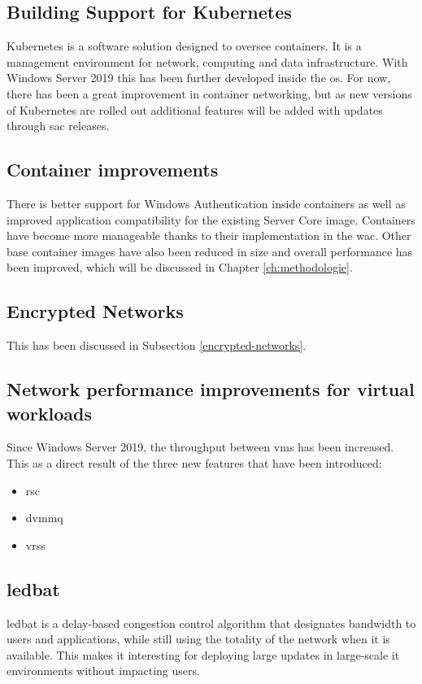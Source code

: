 \subsection*{Building Support for Kubernetes}
Kubernetes is a software solution designed to oversee containers. 
It is a management environment for network, computing and data infrastructure. 
With Windows Server 2019 this has been further developed inside the \acrshort{os}. 
For now, there has been a great improvement in container networking, but as new versions of Kubernetes are rolled out additional features will be added with updates through \acrfull{sac} releases.
\subsection*{Container improvements}
There is better support for Windows Authentication inside containers as well as improved application compatibility for the existing Server Core image. 
Containers have become more manageable thanks to their implementation in the \acrlong{wac}.
Other base container images have also been reduced in size and overall performance has been improved, which will be discussed in Chapter \ref{ch:methodologie}. 
\subsection*{Encrypted Networks}
This has been discussed in Subsection \ref{encrypted-networks}.
\subsection*{Network performance improvements for virtual workloads}
Since Windows Server 2019, the throughput between \acrshort{vm}s has been increased. 
This as a direct result of the three new features that have been introduced:
\begin{itemize}
	\item \acrfull{rsc}
	\item \acrfull{dvmmq}
	\item \acrfull{vrss}
\end{itemize}
\subsection*{\acrfull{ledbat}}
\acrshort{ledbat} is a delay-based congestion control algorithm that designates bandwidth to users and applications, while still using the totality of the network when it is available. \autocite{Shalunov2012}
This makes it interesting for deploying large updates in large-scale \acrshort{it} environments without impacting users.

